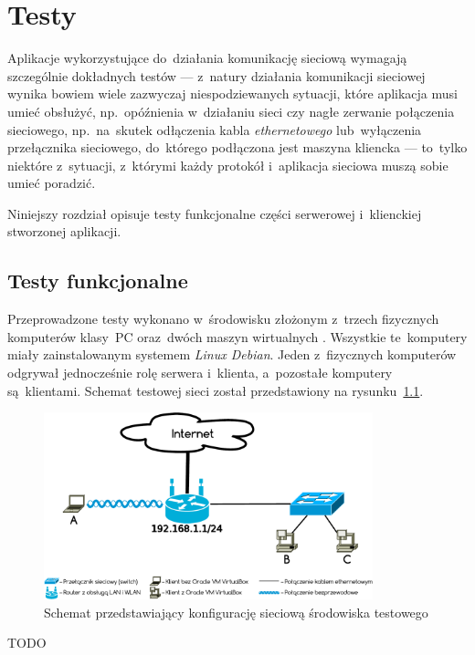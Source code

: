 \documentclass[thesis]{subfiles}
\begin{document}
\chapter{Testy}

Aplikacje wykorzystujące do~działania komunikację sieciową wymagają szczególnie dokładnych testów --- z~natury działania komunikacji sieciowej wynika bowiem wiele zazwyczaj niespodziewanych sytuacji, które aplikacja musi umieć obsłużyć, np.~opóźnienia w~działaniu sieci czy nagłe zerwanie połączenia sieciowego, np.~na~skutek odłączenia kabla \emph{ethernetowego} lub~wyłączenia przełącznika sieciowego, do~którego podłączona jest maszyna kliencka --- to~tylko niektóre z~sytuacji, z~którymi każdy protokół i~aplikacja sieciowa muszą sobie umieć poradzić.

Niniejszy rozdział opisuje testy funkcjonalne części serwerowej i~klienckiej stworzonej aplikacji.

%
%
%

\section{Testy funkcjonalne}

Przeprowadzone testy wykonano w~środowisku złożonym z~trzech fizycznych komputerów klasy~PC oraz~dwóch maszyn wirtualnych . Wszystkie te~komputery miały zainstalowanym systemem \emph{Linux Debian}. Jeden z~fizycznych komputerów odgrywał jednocześnie rolę serwera i~klienta, a~pozostałe komputery są~klientami. Schemat testowej sieci został przedstawiony na rysunku~\ref{fig:testing-network}.

\begin{figure}
	\centering
	\includegraphics[width=0.85\textwidth]{img/testing-network}
	\caption{Schemat przedstawiający konfigurację sieciową środowiska testowego}
	\label{fig:testing-network}
\end{figure}

TODO
\end{document}
